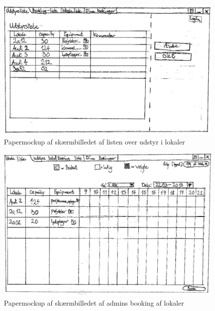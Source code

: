 \begin{figure}[h!]
  \centering
    \includegraphics[angle=90, height=0.9\textheight]{Appendix/GUI-Prototype/PaperMockup/LokaleUdstyrListe_001}
  \caption{Papermockup af skærmbilledet af listen over udstyr i lokaler}
\label{App_GUI_paper_LokaleUdstyrListe}
\end{figure}

\begin{figure}[h!]
  \centering
    \includegraphics[angle=90, height=0.9\textheight]{Appendix/GUI-Prototype/PaperMockup/LokaleListeSuper_001}
  \caption{Papermockup af skærmbilledet af admins booking af lokaler}
\label{App_GUI_paper_LokaleListeSuper}
\end{figure}

